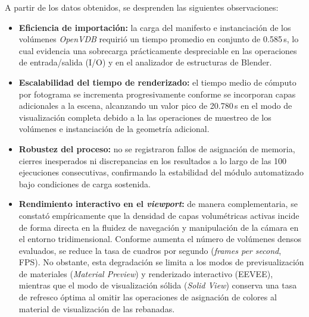 A partir de los datos obtenidos, se desprenden las siguientes observaciones:
\begin{itemize}
    \item \textbf{Eficiencia de importación:} la carga del manifesto e instanciación de los volúmenes \textit{OpenVDB} requirió un tiempo promedio 
    en conjunto de 0.585\,s, lo cual evidencia una sobrecarga prácticamente despreciable en las operaciones de entrada/salida (I/O) y en el 
    analizador de estructuras de Blender.
    \item \textbf{Escalabilidad del tiempo de renderizado:} el tiempo medio de cómputo por fotograma se incrementa progresivamente conforme 
    se incorporan capas adicionales a la escena, alcanzando un valor pico de 20.780\,s en el modo de visualización completa debido a la 
    las operaciones de muestreo de los volúmenes e instanciación de la geometría adicional.
    \item \textbf{Robustez del proceso:} no se registraron fallos de asignación de memoria, cierres inesperados ni discrepancias en los 
    resultados a lo largo de las 100 ejecuciones consecutivas, confirmando la estabilidad del módulo automatizado bajo condiciones de carga 
    sostenida.
    \item \textbf{Rendimiento interactivo en el \textit{viewport}:} de manera complementaria, se constató empíricamente que la densidad de 
    capas volumétricas activas incide de forma directa en la fluidez de navegación y manipulación de la cámara en el entorno tridimensional. 
    Conforme aumenta el número de volúmenes densos evaluados, se reduce la tasa de cuadros por segundo (\textit{frames per second}, FPS). 
    No obstante, esta degradación se limita a los modos de previsualización de materiales (\textit{Material Preview}) y renderizado interactivo 
    (EEVEE), mientras que el modo de visualización sólida (\textit{Solid View}) conserva una tasa de refresco óptima al omitir las operaciones
    de asignación de colores al material de visualización de las rebanadas.
\end{itemize}
